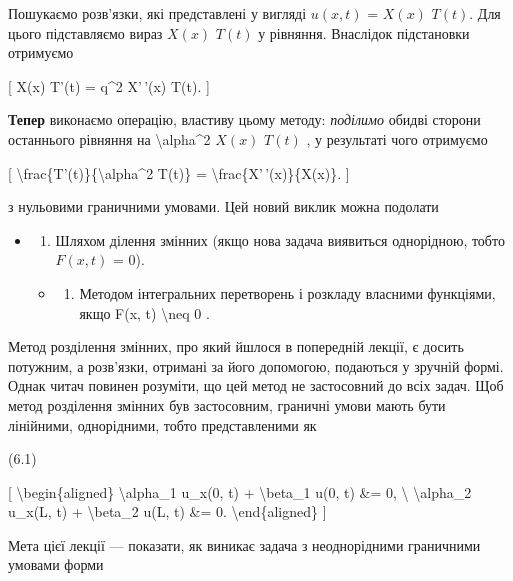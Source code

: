 \documentclass[
]{article}
\providecommand{\tightlist}{%
  \setlength{\itemsep}{0pt}\setlength{\parskip}{0pt}}
\begin{document}
Пошукаємо розв'язки, які представлені у вигляді \(u(x, t)\) = \(X(x)\)
\(T(t)\). Для цього підставляємо вираз \(X(x)\) \(T(t)\) у рівняння.
Внаслідок підстановки отримуємо

{[} X(x) T'(t) = q\^{}2 X'\,'(x) T(t). {]}

\textbf{Тепер} виконаємо операцію, властиву цьому методу:
\emph{поділимо} обидві сторони останнього рівняння на
\textbackslash alpha\^{}2 \(X(x)\) \(T(t)\) , у результаті чого
отримуємо

{[} \textbackslash frac\{T'(t)\}\{\textbackslash alpha\^{}2 T(t)\} =
\textbackslash frac\{X'\,'(x)\}\{X(x)\}. {]}

з нульовими граничними умовами. Цей новий виклик можна подолати

\begin{itemize}
\item
  \begin{enumerate}
  \def\labelenumi{\arabic{enumi}.}
  \tightlist
  \item
    Шляхом ділення змінних (якщо нова задача виявиться однорідною, тобто
    \(F(x, t)\) = 0).
  \end{enumerate}

  \begin{itemize}
  \tightlist
  \item
    \begin{enumerate}
    \def\labelenumi{\arabic{enumi}.}
    \setcounter{enumi}{1}
    \tightlist
    \item
      Методом інтегральних перетворень і розкладу власними функціями,
      якщо F(x, t) \textbackslash neq 0 .
    \end{enumerate}
  \end{itemize}
\end{itemize}

Метод розділення змінних, про який йшлося в попередній лекції, є досить
потужним, а розв'язки, отримані за його допомогою, подаються у зручній
формі. Однак читач повинен розуміти, що цей метод не застосовний до всіх
задач. Щоб метод розділення змінних був застосовним, граничні умови
мають бути лінійними, однорідними, тобто представленими як

(6.1)

{[} \textbackslash begin\{aligned\} \textbackslash alpha\_1 u\_x(0, t) +
\textbackslash beta\_1 u(0, t) \&= 0, \textbackslash{}
\textbackslash alpha\_2 u\_x(L, t) + \textbackslash beta\_2 u(L, t) \&=
0. \textbackslash end\{aligned\} {]}

Мета цієї лекції --- показати, як виникає задача з неоднорідними
граничними умовами форми
\end{document}
